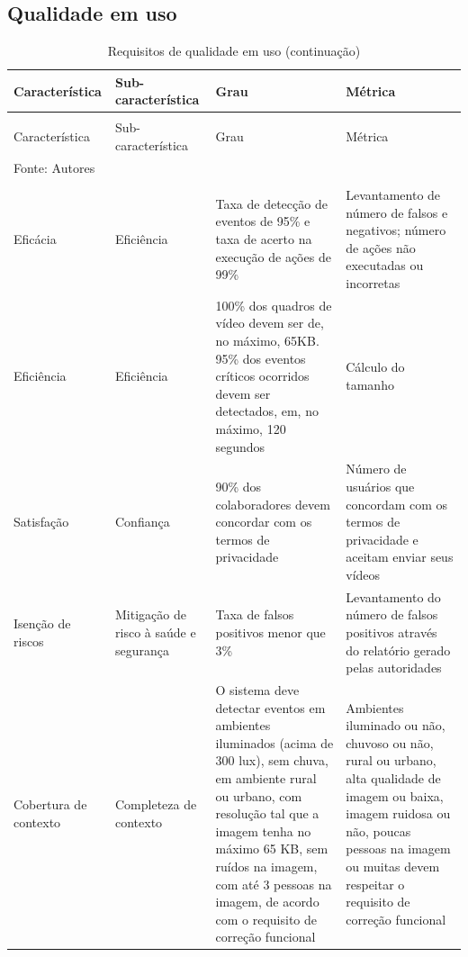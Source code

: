 \documentclass[]{politex}
\begin{document}
\subsection{Qualidade em uso}
\begin{center}
\begin{longtable}{||m{3cm} | m{4cm} | m{4cm} | m{4cm}||} 
\caption{\label{tab:qualidade_em_uso}Requisitos de qualidade em uso}\\
\hline
Característica & Sub-característica & Grau & Métrica \\
\hline\hline
\endfirsthead
\caption[]{Requisitos de qualidade em uso (continuação)} \\
\hline
Característica & Sub-característica & Grau & Métrica \\
\hline\hline
\endhead
\hline\hline
\multicolumn{4}{l}{Fonte: Autores} \\
\endlastfoot
\hline
\multicolumn{4}{r}{\footnotesize{}continua na próxima página} \\
\endfoot
Eficácia & Eficiência & Taxa de detecção de eventos de 95\% e taxa de acerto na execução de ações de 99\% & Levantamento de número de falsos e negativos; número de ações não executadas ou incorretas \\ 
\hline
Eficiência & Eficiência & 100\% dos quadros de vídeo devem ser de, no máximo, 65KB. 95\% dos eventos críticos ocorridos devem ser detectados, em, no máximo, 120 segundos & Cálculo do tamanho \\
\hline
Satisfação & Confiança & 90\% dos colaboradores devem concordar com os termos de privacidade & Número de usuários que concordam com os termos de privacidade e aceitam enviar seus vídeos\\
\hline
Isenção de riscos & Mitigação de risco à saúde e segurança & Taxa de falsos positivos menor que 3\% & Levantamento do número de falsos positivos através do relatório gerado pelas autoridades \\
\hline
Cobertura de contexto & Completeza de contexto & O sistema deve detectar eventos em ambientes iluminados (acima de 300 lux), sem chuva, em ambiente rural ou urbano, com resolução tal que a imagem tenha no máximo 65 KB, sem ruídos na imagem, com até 3 pessoas na imagem, de acordo com o requisito de correção funcional & Ambientes iluminado ou não, chuvoso ou não, rural ou urbano, alta qualidade de imagem ou baixa, imagem ruidosa ou não, poucas pessoas na imagem ou muitas devem respeitar o requisito de correção funcional \\
\end{longtable}
\end{center}
\end{document}

